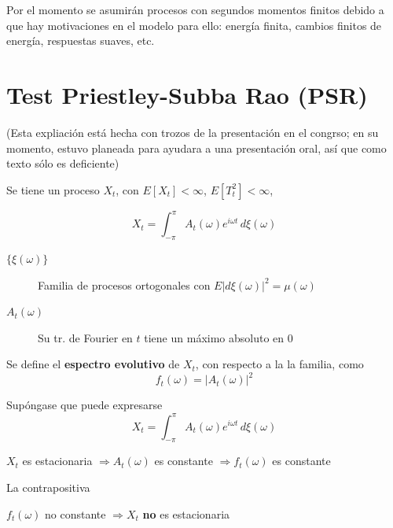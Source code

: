 \documentclass[12pt,a4paper]{mitthesis}
\begin{document}
Por el momento se asumir\'an procesos con segundos momentos finitos debido a que hay motivaciones
en el modelo para ello: energ\'ia finita, cambios finitos de energ\'ia, respuestas suaves, etc.


\section{Test Priestley-Subba Rao (PSR)}

(Esta expliaci\'on est\'a hecha con trozos de la presentaci\'on en el congrso;
en su momento, estuvo planeada para ayudara a una 
presentaci\'on oral, as\'i que como texto s\'olo es deficiente)

Se tiene un proceso $X_t$, con $E[X_t]<\infty$, $E[T_t^{2}]<\infty$,

\begin{equation*}
X_t = \int_{-\pi}^{\pi} A_t(\omega) e^{i\omega t} \, d\xi(\omega)
\end{equation*}

\begin{description}
\item[$\{ \xi(\omega) \}$] Familia de procesos ortogonales con {{ $E \lvert d \xi(\omega) \lvert^{2} = \mu(\omega)$ }}
\item[$A_t(\omega)$] Su tr. de Fourier en $t$ tiene un m\'aximo absoluto en 0
\end{description}

Se define el \textbf{espectro evolutivo} de $X_t$, con respecto a la la familia, como
\begin{equation*}
f_t(\omega) = \lvert A_t(\omega) \lvert^{2}
\end{equation*}

Sup\'ongase que puede expresarse
\begin{equation*}
X_t = \int_{-\pi}^{\pi} A_t(\omega) e^{i\omega t} \, d\xi(\omega)
\end{equation*}

\begin{center}
$X_t$ es estacionaria $\Rightarrow A_t(\omega)$ es constante $\Rightarrow f_t(\omega)$ es constante
\end{center}

La contrapositiva
\begin{center}
$f_t(\omega)$ no constante $\Rightarrow X_t$ \textbf{no} es estacionaria
\end{center}
\end{document}
